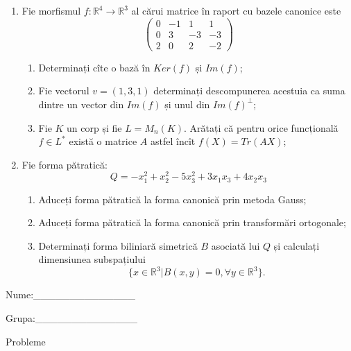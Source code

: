 \documentclass{article}
\begin{document}
\begin{enumerate}
 \item Fie morfismul $f:\mathbb{R}^4 \to \mathbb{R}^3$ al cărui matrice în raport cu bazele canonice este
$$\begin{pmatrix}
0&-1&1&1\\
0&3&-3&-3\\
2&0&2&-2
\end{pmatrix}$$

\begin{enumerate}
\item Determinați cîte o bază în $Ker(f)$ și $Im(f)$;
\item Fie vectorul $v=(1,3,1)$ determinați descompunerea acestuia ca suma dintre un vector din $Im(f)$ și unul din $Im(f)^\perp$;
\item Fie $K$ un corp și fie $L=M_n(K)$. Arătați că pentru orice funcțională $f \in L^*$ există o matrice $A$ astfel încît $f(X)=Tr(AX)$;
\end{enumerate}
\item Fie forma pătratică:
$$Q= -x_1^2+x_2^2-5x_3^2+3x_1x_3+4x_2x_3$$

\begin{enumerate}
\item Aduceți forma pătratică la forma canonică prin metoda Gauss;
\item Aduceți forma pătratică la forma canonică prin transformări ortogonale;
\item Determinați forma biliniară simetrică $B$ asociată lui $Q$ și calculați dimensiunea subspațiului
$$\{x \in \mathbb{R}^3 | B(x,y)=0,\forall y \in \mathbb{R}^3\}.$$

\end{enumerate}
\end{enumerate}
\newpage
\begin{flushright}
Nume:\_\_\_\_\_\_\_\_\_\_\_\_\_\_
 
 
Grupa:\_\_\_\_\_\_\_\_\_\_\_\_\_\_
\end{flushright}
\begin{center}
\vspace{2cm}
{\Large Probleme}
\vspace{2cm}
\end{center}
\end{document}
